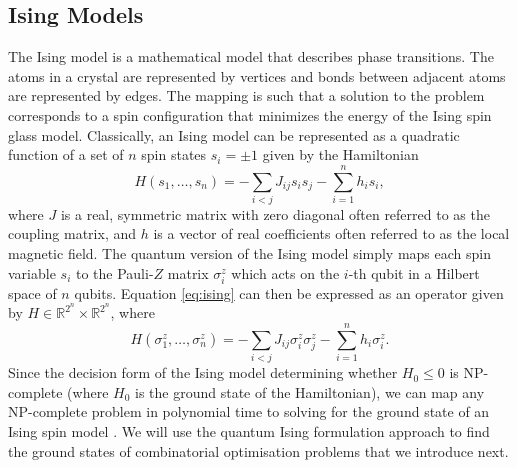 \subsection{Ising Models}

    The Ising model is a mathematical model that describes phase transitions. The atoms in a crystal are represented by vertices and bonds between adjacent atoms are represented by edges. The mapping is such that a solution to the problem corresponds to a spin configuration that minimizes the energy of the Ising spin glass model. Classically, an Ising model can be represented as a quadratic function of a set of $n$ spin states $s_i=\pm1$ given by the Hamiltonian 
    \begin{equation} \label{eq:ising}
        H(s_1,\dots,s_n) = -\sum_{i<j}J_{ij}s_is_j-\sum^n_{i=1}h_is_i,
    \end{equation}
    where $J$ is a real, symmetric matrix with zero diagonal often referred to as the coupling matrix, and $h$ is a vector of real coefficients often referred to as the local magnetic field. The quantum version of the Ising model simply maps each spin variable $s_i$ to the Pauli-$Z$ matrix $\sigma_i^z$ which acts on the $i$-th qubit in a Hilbert space of $n$ qubits. Equation \ref{eq:ising} can then be expressed as an operator given by $H\in \mathbb{R}^{2^n}\times \mathbb{R}^{2^n}$, where
    \begin{equation} \label{eq:ising_quantum}
        H(\sigma^z_1,\dots,\sigma^z_n) = -\sum_{i<j}J_{ij}\sigma^z_i\sigma^z_j-\sum^n_{i=1}h_i\sigma^z_i.
    \end{equation}
    Since the decision form of the Ising model determining whether $H_0\leq 0$ is NP-complete \cite{barahona1982computational} (where $H_0$ is the ground state of the Hamiltonian), we can map any NP-complete problem in polynomial time to solving for the ground state of an Ising spin model \cite{lucas2014ising}. We will use the quantum Ising formulation approach \cite{kirkpatrick1983optimization} to find the ground states of combinatorial optimisation problems that we introduce next.


    


